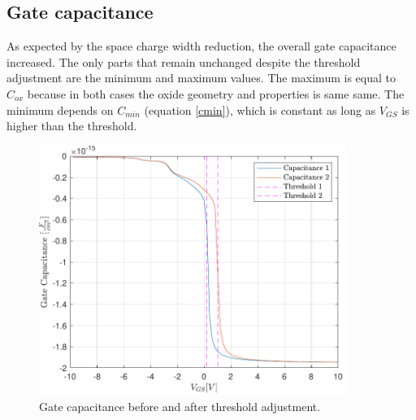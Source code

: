 \documentclass[11pt,a4paper]{article}
\begin{document}
	\subsection{Gate capacitance}
	As expected by the space charge width reduction, the overall gate capacitance increased. The only parts that remain unchanged despite the threshold adjustment are the minimum and maximum values. The maximum is equal to $C_{ox}$ because in both cases the oxide geometry and properties is same same. The minimum depends on $C_{min}$ (equation \ref*{cmin}), which is constant as long as $V_{GS}$ is higher than the threshold.  
		\begin{figure}
			\centering
			\includegraphics[width=100mm]{capacitance12}
			\caption{Gate capacitance before and after threshold adjustment.}
			\label{capacitance12}
		\end{figure}
	\newpage
	\hypersetup{linkcolor = black}
	\listoffigures
	\listoftables
\end{document}
